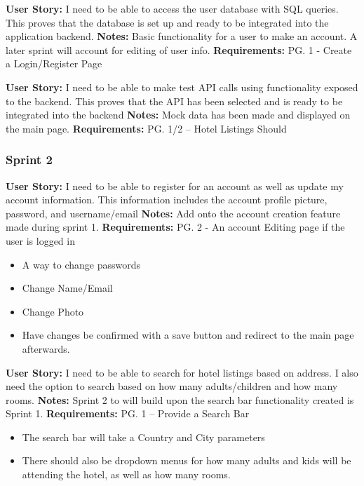 \documentclass[]{article}
\begin{document}
\noindent
\textbf{User Story:} I need to be able to access the user database with SQL queries. This proves that the database is set up and ready to be integrated into the application backend. \newline
\textbf{Notes:} Basic functionality for a user to make an account. A later sprint will account for editing of user info. \newline
\textbf{Requirements:} PG. 1 - Create a Login/Register Page \newline

\noindent
\textbf{User Story:} I need to be able to make test API calls using functionality exposed to the backend. This proves that the API has been selected and is ready to be integrated into the backend \newline
\textbf{Notes:} Mock data has been made and displayed on the main page. \newline
\textbf{Requirements:} PG. 1/2 – Hotel Listings Should \newline

\subsubsection{Sprint 2}

\noindent
\textbf{User Story:} I need to be able to register for an account as well as update my account information. This information includes the account profile picture, password, and username/email \newline
\textbf{Notes:} Add onto the account creation feature made during sprint 1. \newline
\textbf{Requirements:} PG. 2 - An account Editing page if the user is logged in
\begin{itemize}
    \item A way to change passwords
    \item Change Name/Email
    \item Change Photo
    \item Have changes be confirmed with a save button and redirect to the main page afterwards.
\end{itemize}

\noindent
\textbf{User Story:} I need to be able to search for hotel listings based on address. I also need the option to search based on how many adults/children and how many rooms. \newline
\textbf{Notes:} Sprint 2 to will build upon the search bar functionality created is Sprint 1. \newline
\textbf{Requirements:} PG. 1 – Provide a Search Bar
\begin{itemize}
    \item The search bar will take a Country and City parameters
    \item There should also be dropdown menus for how many adults and kids will be attending the hotel, as well as how many rooms.
\end{itemize}
\end{document}
